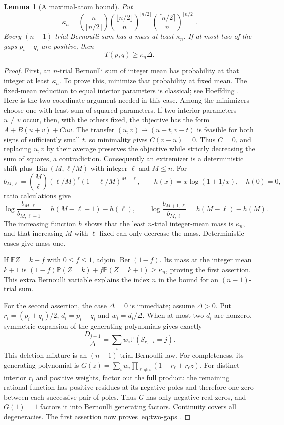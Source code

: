 \documentclass[11pt]{article}
\numberwithin{equation}{section}
\newtheorem{lemma}[theorem]{Lemma}
\theoremstyle{remark}\newtheorem{remark}[theorem]{Remark}
\DeclareMathOperator{\Ber}{Ber}
\DeclareMathOperator{\Bin}{Bin}
\newcommand{\PP}{\mathbb P}
\newcommand{\EE}{\mathbb E}
\begin{document}
\begin{lemma}[A maximal-atom bound]\label{lem:atom}
Put
\[
 \kappa_n=\binom n{\lfloor n/2\rfloor}
 \left(\frac{\lfloor n/2\rfloor}{n}\right)^{\lfloor n/2\rfloor}
 \left(\frac{\lceil n/2\rceil}{n}\right)^{\lceil n/2\rceil}.
\]
Every $(n-1)$-trial Bernoulli sum has a mass at least $\kappa_n$.
If at most two of the gaps $p_i-q_i$ are positive, then
\begin{equation}\label{eq:two-gaps}
 T(p,q)\ge\kappa_n\Delta.
\end{equation}
\end{lemma}
\begin{proof}
First, an $n$-trial Bernoulli sum of integer mean has probability at
that integer at least $\kappa_n$. To prove this, minimize that probability
at fixed mean. The fixed-mean reduction to equal interior parameters is
classical; see Hoeffding \cite{Hoeffding}. Here is the two-coordinate
argument needed in this case. Among the minimizers choose one with least
sum of squared parameters. If two interior parameters $u\ne v$ occur,
then, with the others fixed, the objective has the form
$A+B(u+v)+Cuv$. The transfer $(u,v)\mapsto(u+t,v-t)$ is feasible for
both signs of sufficiently small $t$, so minimality gives
$C(v-u)=0$. Thus $C=0$, and replacing $u,v$ by their average preserves
the objective while strictly decreasing the sum of squares, a
contradiction. Consequently an extremizer is a deterministic shift plus
$\Bin(M,\ell/M)$ with integer $\ell$ and $M\le n$.
For
\[
 b_{M,\ell}=\binom M\ell(\ell/M)^\ell(1-\ell/M)^{M-\ell},
 \qquad h(x)=x\log(1+1/x),\quad h(0)=0,
\]
ratio calculations give
\[
 \log\frac{b_{M,\ell}}{b_{M,\ell+1}}
 =h(M-\ell-1)-h(\ell),\qquad
 \log\frac{b_{M+1,\ell}}{b_{M,\ell}}=h(M-\ell)-h(M).
\]
The increasing function $h$ shows that the least $n$-trial integer-mean
mass is $\kappa_n$, and that increasing $M$ with $\ell$ fixed can only
decrease the mass. Deterministic cases give mass one.

If $\EE Z=k+f$ with $0\le f\le1$, adjoin
$\Ber(1-f)$. Its mass at the integer mean $k+1$ is
$(1-f)\PP(Z=k)+f\PP(Z=k+1)\ge\kappa_n$, proving the first assertion.
This extra Bernoulli variable explains the index $n$ in the bound for an
$(n-1)$-trial sum.

For the second assertion, the case $\Delta=0$ is immediate; assume
$\Delta>0$. Put $r_i=(p_i+q_i)/2$, $d_i=p_i-q_i$ and
$w_i=d_i/\Delta$. When at most two $d_i$ are nonzero, symmetric expansion
of the generating polynomials gives exactly
\[
 \frac{D_{j+1}}\Delta
 =\sum_iw_i\PP(S_{r,-i}=j).
\]
This deletion mixture is an $(n-1)$-trial Bernoulli law. For completeness,
its generating polynomial is
$G(z)=\sum_iw_i\prod_{\ell\ne i}(1-r_\ell+r_\ell z)$.
For distinct interior $r_i$ and positive weights, factor out the full
product: the remaining rational function has positive residues at its
negative poles and therefore one zero between each successive pair of
poles. Thus $G$ has only negative real zeros, and $G(1)=1$ factors it
into Bernoulli generating factors. Continuity covers all degeneracies.
The first assertion now proves \eqref{eq:two-gaps}.
\end{proof}
\end{document}
